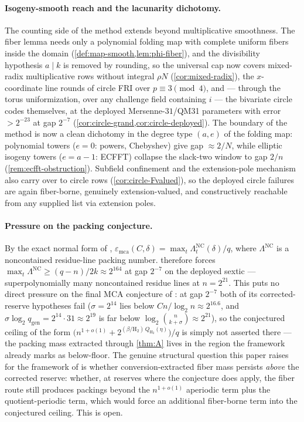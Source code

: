 \documentclass[11pt]{article}
\theoremstyle{definition}
\theoremstyle{remark}
\newcommand{\emca}{\varepsilon_{\mathrm{mca}}}
\newcommand{\Hb}{\mathrm{H}_2}
\begin{document}
\paragraph{Isogeny-smooth reach and the lacunarity dichotomy.}
The counting side of the method extends beyond multiplicative smoothness. The fiber lemma needs only a polynomial folding map with complete uniform fibers inside the domain (\cref{def:map-smooth,lem:phi-fiber}), and the divisibility hypothesis $a\mid k$ is removed by rounding, so the universal cap now covers mixed-radix multiplicative rows without integral $\rho N$ (\cref{cor:mixed-radix}), the $x$-coordinate line rounds of circle FRI over $p\equiv3\pmod4$, and --- through the torus uniformization, over any challenge field containing $i$ --- the bivariate circle codes themselves, at the deployed Mersenne-$31$/QM31 parameters with error $>2^{-23}$ at gap $2^{-7}$ (\cref{cor:circle-grand,cor:circle-deployed}). The boundary of the method is now a clean dichotomy in the degree type $(a,e)$ of the folding map: polynomial towers ($e=0$: powers, Chebyshev) give gap $\approx2/N$, while elliptic isogeny towers ($e=a-1$: ECFFT) collapse the slack-two window to gap $2/n$ (\cref{rem:ecfft-obstruction}). Subfield confinement and the extension-pole mechanism also carry over to circle rows (\cref{cor:circle-Fvalued}), so the deployed circle failures are again fiber-borne, genuinely extension-valued, and constructively reachable from any supplied list via extension poles.

\paragraph{Pressure on the packing conjecture.}
By the exact normal form of \cite{Cho26b}, $\emca(C,\delta)=\max_t\Lambda^{\mathrm{NC}}_t(\delta)/q$, where $\Lambda^{\mathrm{NC}}$ is a noncontained residue-line packing number.  therefore forces $\max_t\Lambda^{\mathrm{NC}}\ge(q-n)/2k\approx2^{164}$ at gap $2^{-7}$ on the deployed sextic --- superpolynomially many noncontained residue lines at $n=2^{21}$. This puts no direct pressure on the final MCA conjecture of \cite[Conj.\ ``Final floor- and quotient-corrected MCA asymptotic'']{Cho26b}: at gap $2^{-7}$ both of its corrected-reserve hypotheses fail ($\sigma=2^{14}$ lies below $Cn/\log_2n\approx2^{16.6}$, and $\sigma\log_2 q_{\mathrm{gen}}=2^{14}\cdot31\approx2^{19}$ is far below $\log_2\binom n{k+\sigma}\approx2^{21}$), so the conjectured ceiling of the form $\bigl(n^{1+o(1)}+2^{(\beta/\Hb)\,Q_{\Hb}(\eta)}\bigr)/q$ is simply not asserted there --- the packing mass extracted through \cref{thm:A} lives in the region the framework already marks as below-floor. The genuine structural question this paper raises for the framework of \cite{Cho26b} is whether conversion-extracted fiber mass persists \emph{above} the corrected reserve: whether, at reserves where the conjecture does apply, the fiber route still produces packings beyond the $n^{1+o(1)}$ aperiodic term plus the quotient-periodic term, which would force an additional fiber-borne term into the conjectured ceiling. This is open.
\end{document}
